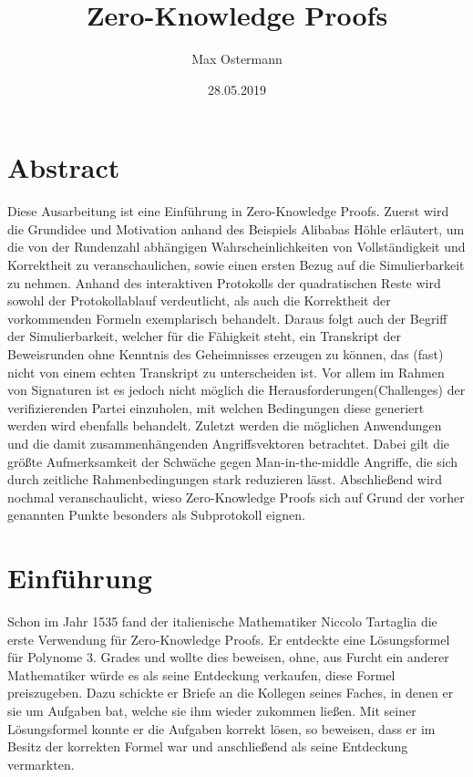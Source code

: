 \documentclass {article}
\title{Zero-Knowledge Proofs}
\author{Max Ostermann}
\date{28.05.2019}
\begin{document}
\maketitle
{}
\newpage
{}

\section{Abstract}
Diese Ausarbeitung ist eine Einführung in Zero-Knowledge Proofs.
Zuerst wird die Grundidee und Motivation anhand des Beispiels Alibabas H\"ohle erl\"autert, um die von der Rundenzahl abh\"angigen Wahrscheinlichkeiten von Vollst\"andigkeit und Korrektheit zu veranschaulichen, sowie einen ersten Bezug auf die Simulierbarkeit zu nehmen. Anhand des interaktiven Protokolls der quadratischen Reste wird sowohl der Protokollablauf verdeutlicht, als auch die Korrektheit der vorkommenden Formeln exemplarisch behandelt. Daraus folgt auch der Begriff der Simulierbarkeit, welcher für die F\"ahigkeit steht, ein Transkript der Beweisrunden ohne Kenntnis des Geheimnisses erzeugen zu können, das (fast) nicht von einem echten Transkript zu unterscheiden ist. Vor allem im Rahmen von Signaturen ist es jedoch nicht m\"oglich die Herausforderungen(Challenges) der verifizierenden Partei einzuholen, mit welchen Bedingungen diese generiert werden wird ebenfalls behandelt. 
Zuletzt werden die m\"oglichen Anwendungen und die damit zusammenh\"angenden Angriffsvektoren betrachtet. Dabei gilt die gr\"oßte Aufmerksamkeit der Schw\"ache gegen Man-in-the-middle Angriffe, die sich durch zeitliche Rahmenbedingungen stark reduzieren l\"asst. Abschlie\ss{}end wird nochmal veranschaulicht, wieso Zero-Knowledge Proofs sich auf Grund der vorher genannten Punkte besonders als Subprotokoll eignen.


\newpage

\tableofcontents

\newpage 

\section{Einf\"uhrung}

Schon im Jahr 1535 fand der italienische Mathematiker Niccolo Tartaglia die erste Verwendung für Zero-Knowledge Proofs. Er entdeckte eine Lösungsformel für Polynome 3. Grades und wollte dies beweisen, ohne, aus Furcht ein anderer Mathematiker würde es als seine Entdeckung verkaufen, diese Formel preiszugeben. Dazu schickte er Briefe an die Kollegen seines Faches, in denen er sie um Aufgaben bat, welche sie ihm wieder zukommen lie\ss{}en. Mit seiner L\"osungsformel konnte er die Aufgaben korrekt l\"osen, so beweisen, dass er im Besitz der korrekten Formel war und anschlie\ss{}end als seine Entdeckung vermarkten. \\
\end{document}
